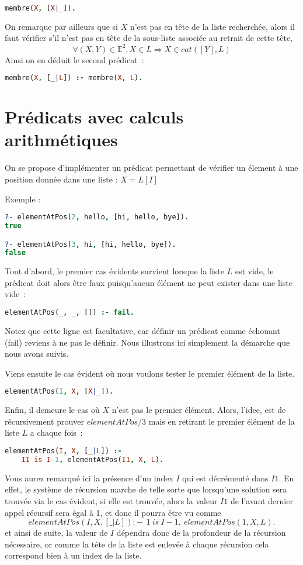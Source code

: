 \begin{lstlisting}[language=Prolog,frame=single]
membre(X, [X|_]).
\end{lstlisting}

On remarque par ailleurs que si $X$ n'est pas en tête de la liste recherchée, alors il faut vérifier s'il n'est pas en tête de la sous-liste associée au retrait de cette tête, 
\[\forall (X, Y) \in \mathbb{E}^2, X \in L \Rightarrow X \in cat([Y], L)\]
Ainsi on en déduit le second prédicat~:
\begin{lstlisting}[language=Prolog,frame=single]
membre(X, [_|L]) :- membre(X, L).
\end{lstlisting}


\section{Prédicats avec calculs arithmétiques}

On se propose d'implémenter un prédicat permettant de vérifier un élement à une
position donnée dans une liste : $X = L[I]$

Exemple :
\begin{lstlisting}[language=Prolog,frame=single]
?- elementAtPos(2, hello, [hi, hello, bye]).
true

?- elementAtPos(3, hi, [hi, hello, bye]).
false
\end{lstlisting}


Tout d'abord, le premier cas évidents survient lorsque la liste $L$ est vide, le
prédicat doit alors être faux puisqu'aucun élément ne peut exister dans une liste vide~:
\begin{lstlisting}[language=Prolog,frame=single]
elementAtPos(_, _, []) :- fail.
\end{lstlisting}
Notez que cette ligne est facultative, car définir un prédicat comme échouant
(fail) reviens à ne pas le définir. Nous illustrons ici simplement la démarche que nous avons suivis.

Viens ensuite le cas évident où nous voulons tester le premier élément de la
liste.
\begin{lstlisting}[language=Prolog,frame=single]
elementAtPos(1, X, [X|_]).
\end{lstlisting}

Enfin, il demeure le cas où $X$ n'est pas le premier élément. Alors, l'idee, est
de récursivement prouver $elementAtPos/3$ mais en retirant le premier élément de la liste $L$
a chaque fois~:
\begin{lstlisting}[language=Prolog,frame=single]
elementAtPos(I, X, [_|L]) :-
    I1 is I-1, elementAtPos(I1, X, L).
\end{lstlisting}
Vous aurez remarqué ici la présence d'un index $I$ qui est décrémenté dans $I1$. En effet, le système de récursion marche de telle sorte que lorsqu'une solution sera trouvée via le cas évident, si elle est trouvée, alors la valeur $I1$ de l'avant dernier appel récursif sera égal à 1, et donc il pourra être vu comme 
\[
elementAtPos(I, X, [\_|L]) :-\ \ 1\ is\ I-1,\ elementAtPos(1, X, L).
\] et ainsi de suite, la valeur de $I$ dépendra donc de la profondeur de la récursion nécessaire, or comme la tête de la liste est enlevée à chaque récursion cela correspond bien à un index de la liste. 

